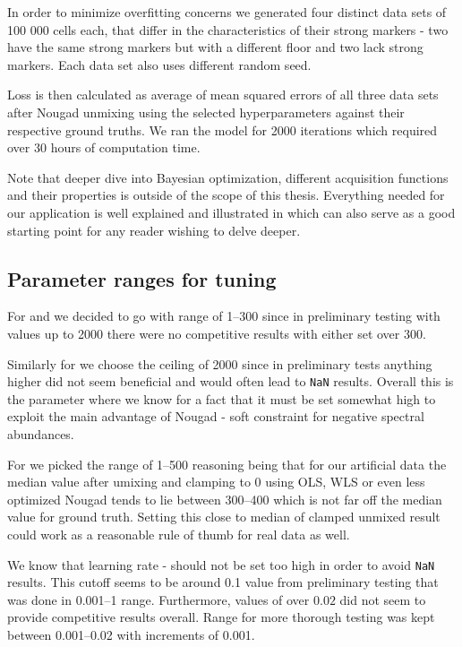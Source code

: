 In order to minimize overfitting concerns we generated four distinct data sets of 100 000 cells each, that differ in the characteristics of their strong markers - two have the same strong markers but with a different floor and two lack strong markers. Each data set also uses different random seed.

Loss is then calculated as average of mean squared errors of all three data sets after Nougad unmixing using the selected hyperparameters against their respective ground truths. We ran the model for 2000 iterations which required over 30 hours of computation time.

Note that deeper dive into Bayesian optimization, different acquisition functions and their properties is outside of the scope of this thesis. Everything needed for our application is well explained and illustrated in \cite{Bayes2016} which can also serve as a good starting point for any reader wishing to delve deeper. 

\subsection{Parameter ranges for tuning}
For  and  we decided to go with range of 1--300 since in preliminary testing with values up to 2000 there were no competitive results with either set over 300.

Similarly for  we choose the ceiling of 2000 since in preliminary tests anything higher did not seem beneficial and would often lead to \texttt{NaN} results. Overall this is the parameter where we know for a fact that it must be set somewhat high to exploit the main advantage of Nougad - soft constraint for negative spectral abundances. 

For  we picked the range of 1--500 reasoning being that for our artificial data the median value after umixing and clamping to 0 using OLS, WLS or even less optimized Nougad tends to lie between 300--400 which is not far off the median value for ground truth. Setting this close to median of clamped unmixed result could work as a reasonable rule of thumb for real data as well.

We know that learning rate -  should not be set too high in order to avoid \texttt{NaN} results. This cutoff seems to be around 0.1 value from preliminary testing that was done in 0.001--1 range. Furthermore, values of over $0.02$ did not seem to provide competitive results overall. Range for more thorough testing was kept between 0.001--0.02 with increments of 0.001.

